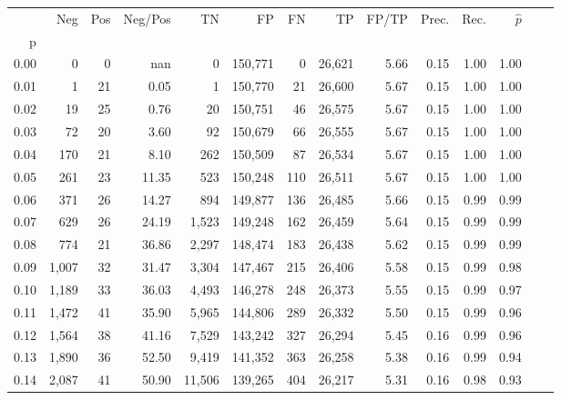 \begin{tabular}{rrrrrrrrrrrrrr}
\toprule
{} &    Neg &  Pos & Neg/Pos &       TN &       FP &      FN &      TP &  FP/TP & Prec. &  Rec. & $\hat{p}$ \\
p    &        &      &         &          &          &         &         &        &       &       &           \\
\midrule
0.00 &      0 &    0 &     nan &        0 &  150,771 &       0 &  26,621 &   5.66 &  0.15 &  1.00 &      1.00 \\
0.01 &      1 &   21 &    0.05 &        1 &  150,770 &      21 &  26,600 &   5.67 &  0.15 &  1.00 &      1.00 \\
0.02 &     19 &   25 &    0.76 &       20 &  150,751 &      46 &  26,575 &   5.67 &  0.15 &  1.00 &      1.00 \\
0.03 &     72 &   20 &    3.60 &       92 &  150,679 &      66 &  26,555 &   5.67 &  0.15 &  1.00 &      1.00 \\
0.04 &    170 &   21 &    8.10 &      262 &  150,509 &      87 &  26,534 &   5.67 &  0.15 &  1.00 &      1.00 \\
0.05 &    261 &   23 &   11.35 &      523 &  150,248 &     110 &  26,511 &   5.67 &  0.15 &  1.00 &      1.00 \\
0.06 &    371 &   26 &   14.27 &      894 &  149,877 &     136 &  26,485 &   5.66 &  0.15 &  0.99 &      0.99 \\
0.07 &    629 &   26 &   24.19 &    1,523 &  149,248 &     162 &  26,459 &   5.64 &  0.15 &  0.99 &      0.99 \\
0.08 &    774 &   21 &   36.86 &    2,297 &  148,474 &     183 &  26,438 &   5.62 &  0.15 &  0.99 &      0.99 \\
0.09 &  1,007 &   32 &   31.47 &    3,304 &  147,467 &     215 &  26,406 &   5.58 &  0.15 &  0.99 &      0.98 \\
0.10 &  1,189 &   33 &   36.03 &    4,493 &  146,278 &     248 &  26,373 &   5.55 &  0.15 &  0.99 &      0.97 \\
0.11 &  1,472 &   41 &   35.90 &    5,965 &  144,806 &     289 &  26,332 &   5.50 &  0.15 &  0.99 &      0.96 \\
0.12 &  1,564 &   38 &   41.16 &    7,529 &  143,242 &     327 &  26,294 &   5.45 &  0.16 &  0.99 &      0.96 \\
0.13 &  1,890 &   36 &   52.50 &    9,419 &  141,352 &     363 &  26,258 &   5.38 &  0.16 &  0.99 &      0.94 \\
0.14 &  2,087 &   41 &   50.90 &   11,506 &  139,265 &     404 &  26,217 &   5.31 &  0.16 &  0.98 &      0.93 \\

\end{tabular}
